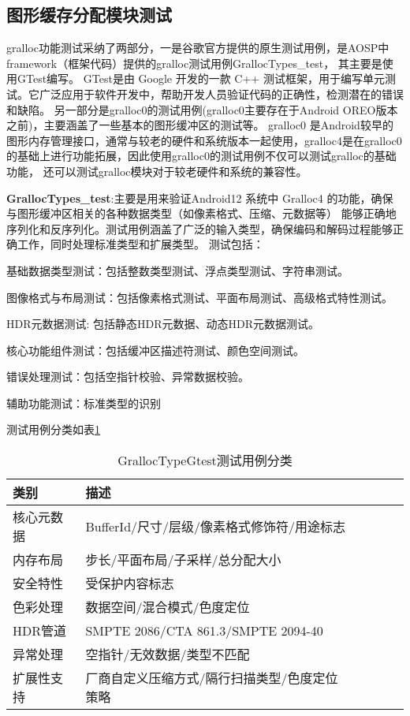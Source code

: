 \subsection{图形缓存分配模块测试}
gralloc功能测试采纳了两部分，一是谷歌官方提供的原生测试用例，是AOSP中framework（框架代码）提供的gralloc测试用例GrallocTypes\_test，
其主要是使用GTest编写。
GTest\cite{GoogleTest}是由 Google 开发的一款 C++ 测试框架，用于编写单元测试。它广泛应用于软件开发中，帮助开发人员验证代码的正确性，检测潜在的错误和缺陷。
另一部分是gralloc0的测试用例(gralloc0主要存在于Android OREO版本之前)，主要涵盖了一些基本的图形缓冲区的测试等。
gralloc0 是Android较早的图形内存管理接口，通常与较老的硬件和系统版本一起使用，gralloc4是在gralloc0的基础上进行功能拓展，因此使用gralloc0的测试用例不仅可以测试gralloc的基础功能，
还可以测试gralloc模块对于较老硬件和系统的兼容性。

\textbf{GrallocTypes\_test}:主要是用来验证Android12 系统中 Gralloc4 的功能，确保与图形缓冲区相关的各种数据类型（如像素格式、压缩、元数据等）
能够正确地序列化和反序列化。测试用例涵盖了广泛的输入类型，确保编码和解码过程能够正确工作，同时处理标准类型和扩展类型。
测试包括：

    基础数据类型测试：包括整数类型测试、浮点类型测试、字符串测试。

    图像格式与布局测试：包括像素格式测试、平面布局测试、高级格式特性测试。

    HDR元数据测试: 包括静态HDR元数据、动态HDR元数据测试。

    核心功能组件测试：包括缓冲区描述符测试、颜色空间测试。

    错误处理测试：包括空指针校验、异常数据校验。
    
    辅助功能测试：标准类型的识别

测试用例分类如表\ref{tab:GrallocTypeGtest测试用例分类}

\begin{table}[H]
    \centering
    \caption{GrallocTypeGtest测试用例分类}
    \label{tab:GrallocTypeGtest测试用例分类}
    \begin{tabular}{llllll}
      \toprule
      类别 & 描述  \\
      \midrule
      核心元数据 & BufferId/尺寸/层级/像素格式修饰符/用途标志  \\
      内存布局 & 步长/平面布局/子采样/总分配大小 \\
      安全特性 & 受保护内容标志 \\
      色彩处理 & 数据空间/混合模式/色度定位 \\
      HDR管道 & SMPTE 2086/CTA 861.3/SMPTE 2094-40 \\
      异常处理 & 空指针/无效数据/类型不匹配 \\
      扩展性支持 & 厂商自定义压缩方式/隔行扫描类型/色度定位策略 \\
      \bottomrule
    \end{tabular}
    \note{}
\end{table}


